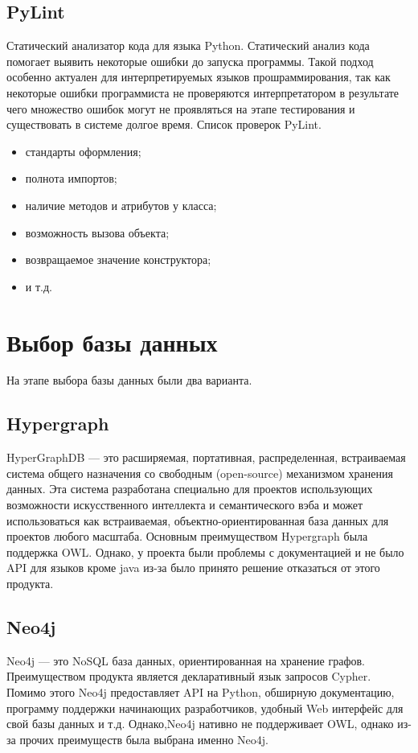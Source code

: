 \subsection{PyLint}
Статический анализатор кода для языка Python. Статический анализ кода помогает выявить некоторые ошибки до запуска программы. Такой подход особенно актуален для интерпретируемых языков прошраммирования, так как некоторые ошибки программиста не проверяются интерпретатором в результате чего множество ошибок могут не проявляться на этапе тестирования и существовать в системе долгое время.
Список проверок PyLint.\cite{pylint}
\begin{itemize}
\item стандарты оформления;
\item полнота импортов;
\item наличие методов и атрибутов у класса;
\item возможность вызова объекта;
\item возвращаемое значение конструктора;
\item и т.д.
\end{itemize}  
\section{Выбор базы данных}
На этапе выбора базы данных были два варианта.
\subsection{Hypergraph}
HyperGraphDB — это расширяемая, портативная, распределенная, встраиваемая система общего назначения со свободным (open-source) механизмом хранения данных. Эта система разработана специально для проектов использующих возможности искусственного интеллекта и семантического вэба и может использоваться как встраиваемая, объектно-ориентированная база данных для проектов любого масштаба.\cite{HG}
Основным преимуществом Hypergraph была поддержка OWL. Однако, у проекта были проблемы с документацией и не было API для языков кроме java из-за было принято решение отказаться от этого продукта.
\subsection{Neo4j} 
Neo4j — это NoSQL база данных, ориентированная на хранение графов. Преимуществом продукта является декларативный язык запросов Cypher.\\
Помимо этого Neo4j предоставляет API на Python, обширную документацию, программу поддержки начинающих разработчиков, удобный Web интерфейс для свой базы данных и т.д. Однако,Neo4j нативно не поддерживает OWL, однако из-за прочих преимуществ была выбрана именно Neo4j. 

